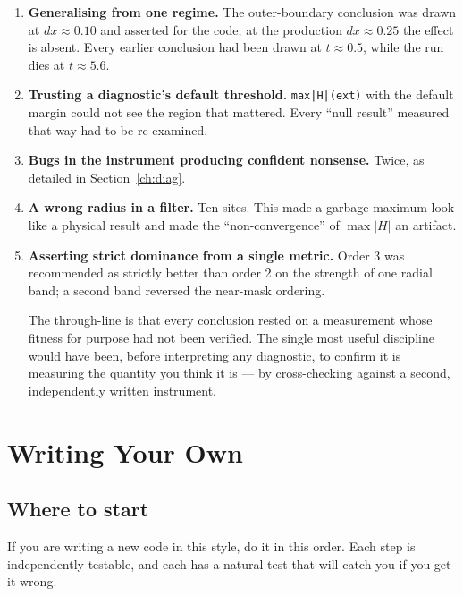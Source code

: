 \begin{enumerate}
\item \textbf{Generalising from one regime.} The outer-boundary conclusion was
      drawn at $dx \approx 0.10$ and asserted for the code; at the production
      $dx \approx 0.25$ the effect is absent. Every earlier conclusion had
      been drawn at $t \approx 0.5$, while the run dies at $t \approx 5.6$.
\item \textbf{Trusting a diagnostic's default threshold.} \texttt{max|H|(ext)}
      with the default margin could not see the region that mattered. Every
      ``null result'' measured that way had to be re-examined.
\item \textbf{Bugs in the instrument producing confident nonsense.} Twice, as
      detailed in Section~\ref{ch:diag}.
\item \textbf{A wrong radius in a filter.} Ten sites. This made a garbage
      maximum look like a physical result and made the ``non-convergence'' of
      $\max|H|$ an artifact.
\item \textbf{Asserting strict dominance from a single metric.} Order 3 was
      recommended as strictly better than order 2 on the strength of one
      radial band; a second band reversed the near-mask ordering.

The through-line is that every conclusion rested on a measurement whose
fitness for purpose had not been verified. The single most useful discipline
would have been, before interpreting any diagnostic, to confirm it is measuring
the quantity you think it is --- by cross-checking against a second,
independently written instrument.
\end{enumerate}

\section{Writing Your Own}
\label{ch:extend}

\subsection{Where to start}

If you are writing a new code in this style, do it in this order. Each step is
independently testable, and each has a natural test that will catch you if you
get it wrong.

